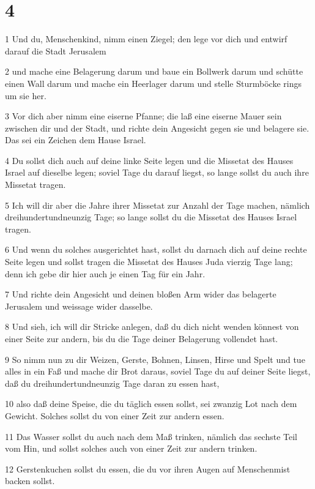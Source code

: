 \chapter{4}

\par 1 Und du, Menschenkind, nimm einen Ziegel; den lege vor dich und entwirf darauf die Stadt Jerusalem
\par 2 und mache eine Belagerung darum und baue ein Bollwerk darum und schütte einen Wall darum und mache ein Heerlager darum und stelle Sturmböcke rings um sie her.
\par 3 Vor dich aber nimm eine eiserne Pfanne; die laß eine eiserne Mauer sein zwischen dir und der Stadt, und richte dein Angesicht gegen sie und belagere sie. Das sei ein Zeichen dem Hause Israel.
\par 4 Du sollst dich auch auf deine linke Seite legen und die Missetat des Hauses Israel auf dieselbe legen; soviel Tage du darauf liegst, so lange sollst du auch ihre Missetat tragen.
\par 5 Ich will dir aber die Jahre ihrer Missetat zur Anzahl der Tage machen, nämlich dreihundertundneunzig Tage; so lange sollst du die Missetat des Hauses Israel tragen.
\par 6 Und wenn du solches ausgerichtet hast, sollst du darnach dich auf deine rechte Seite legen und sollst tragen die Missetat des Hauses Juda vierzig Tage lang; denn ich gebe dir hier auch je einen Tag für ein Jahr.
\par 7 Und richte dein Angesicht und deinen bloßen Arm wider das belagerte Jerusalem und weissage wider dasselbe.
\par 8 Und sieh, ich will dir Stricke anlegen, daß du dich nicht wenden könnest von einer Seite zur andern, bis du die Tage deiner Belagerung vollendet hast.
\par 9 So nimm nun zu dir Weizen, Gerste, Bohnen, Linsen, Hirse und Spelt und tue alles in ein Faß und mache dir Brot daraus, soviel Tage du auf deiner Seite liegst, daß du dreihundertundneunzig Tage daran zu essen hast,
\par 10 also daß deine Speise, die du täglich essen sollst, sei zwanzig Lot nach dem Gewicht. Solches sollst du von einer Zeit zur andern essen.
\par 11 Das Wasser sollst du auch nach dem Maß trinken, nämlich das sechste Teil vom Hin, und sollst solches auch von einer Zeit zur andern trinken.
\par 12 Gerstenkuchen sollst du essen, die du vor ihren Augen auf Menschenmist backen sollst.

